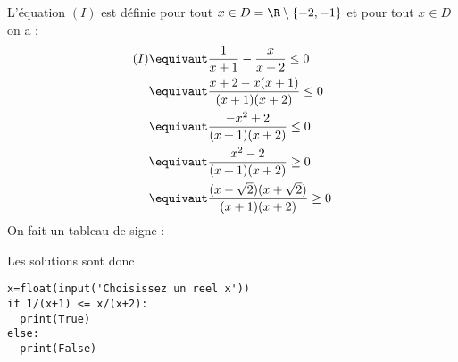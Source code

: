 \documentclass[a4paper, 11pt,reqno]{article}
\begin{document}
\begin{correction}
L'équation $(I)$ est définie pour tout $x\in D=\R\setminus\{ -2,-1\}$ et pour tout $x\in D$ on a :
\begin{align*}
(I)\equivaut &\frac{1}{x+1}- \frac{x}{x+2}\leq 0\\
\equivaut & \frac{x+2 -x(x+1)}{(x+1)(x+2)}\leq 0\\
\equivaut &  \frac{-x^2 +2 }{(x+1)(x+2)}\leq 0\\
\equivaut &  \frac{x^2 -2 }{(x+1)(x+2)}\geq 0\\
\equivaut &  \frac{(x -\sqrt{2}) (x+\sqrt{2}) }{(x+1)(x+2)}\geq 0
\end{align*}
On fait un tableau de signe  : 

Les solutions sont donc 
\conclusion{$\bS = ]-\infty, -2[\cup [-\sqrt{2} ,-1[\cup [\sqrt{2}, +\infty[$}

\begin{lstlisting}
x=float(input('Choisissez un reel x')) 
if 1/(x+1) <= x/(x+2):
  print(True)
else:
  print(False)
\end{lstlisting}
\end{correction}
\end{document}
